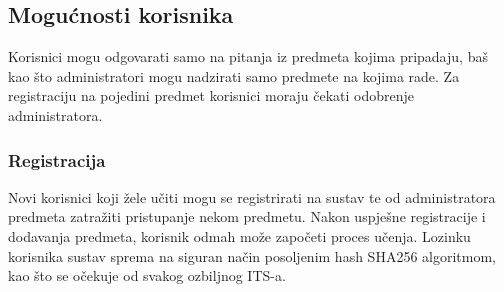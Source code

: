 \documentclass[times, utf8, zavrsni, numeric]{fer}
\begin{document}
\subsection{Mogućnosti korisnika}
Korisnici mogu odgovarati samo na pitanja iz predmeta kojima pripadaju, baš kao što administratori mogu nadzirati samo predmete na kojima rade. Za registraciju na pojedini predmet korisnici moraju čekati odobrenje administratora.

\subsubsection{Registracija}
Novi korisnici koji žele učiti mogu se registrirati na sustav te od administratora predmeta zatražiti pristupanje nekom predmetu. Nakon uspješne registracije i dodavanja predmeta, korisnik odmah može započeti proces učenja. Lozinku korisnika sustav sprema na siguran način posoljenim hash SHA256 algoritmom, kao što se očekuje od svakog ozbiljnog ITS-a.
\end{document}
